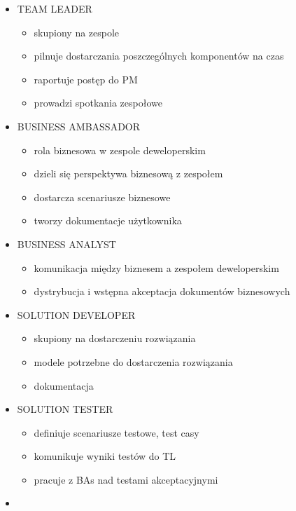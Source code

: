 \documentclass[a4paper]{article}
\begin{document}
\begin{itemize}
        \item TEAM LEADER
        \begin{itemize}
            \item skupiony na zespole
            \item pilnuje dostarczania poszczególnych komponentów na czas
            \item raportuje postęp do PM
            \item prowadzi spotkania zespołowe
        \end{itemize}
        \item BUSINESS AMBASSADOR
        \begin{itemize}
            \item rola biznesowa w zespole deweloperskim
            \item dzieli się perspektywa biznesową z zespołem
            \item dostarcza scenariusze biznesowe
            \item tworzy dokumentacje użytkownika
        \end{itemize}
        \item BUSINESS ANALYST
        \begin{itemize}
        \item komunikacja między biznesem a zespołem deweloperskim
        \item dystrybucja i wstępna akceptacja dokumentów biznesowych
        \end{itemize}
        \item SOLUTION DEVELOPER
        \begin{itemize}
            \item skupiony na dostarczeniu rozwiązania
            \item modele potrzebne do dostarczenia rozwiązania
            \item dokumentacja
        \end{itemize}
        \item SOLUTION TESTER
        \begin{itemize}
            \item definiuje scenariusze testowe, test casy
            \item komunikuje wyniki testów do TL
            \item pracuje z BAs nad testami akceptacyjnymi
        \end{itemize}
        \item
    \end{itemize}
\end{document}

